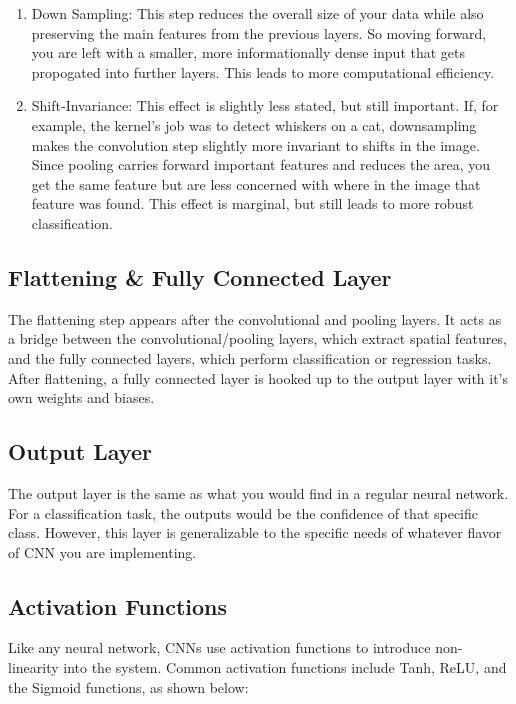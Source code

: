 \documentclass{article}
\begin{document}
        \begin{enumerate}
            \item Down Sampling: This step reduces the overall size of your data while also preserving the main features from the previous layers. So moving forward, you are left with a smaller, more informationally dense input that gets propogated into further layers. This leads to more computational efficiency.
            \item Shift-Invariance: This effect is slightly less stated, but still important. If, for example, the kernel's job was to detect whiskers on a cat, downsampling makes the convolution step slightly more invariant to shifts in the image. Since pooling carries forward important features and reduces the area, you get the same feature but are less concerned with where in the image that feature was found. This effect is marginal, but still leads to more robust classification.
        \end{enumerate}

    \subsection{Flattening \& Fully Connected Layer}
        The flattening step appears after the convolutional and pooling layers. It acts as a bridge between the convolutional/pooling layers, which extract spatial features, and the fully connected layers, which perform classification or regression tasks. After flattening, a fully connected layer is hooked up to the output layer with it's own weights and biases.
        
    \subsection{Output Layer}
        The output layer is the same as what you would find in a regular neural network. For a classification task, the outputs would be the confidence of that specific class. However, this layer is generalizable to the specific needs of whatever flavor of CNN you are implementing.

    \subsection{Activation Functions}
        Like any neural network, CNNs use activation functions to introduce non-linearity into the system. Common activation functions include Tanh, ReLU, and the Sigmoid functions, as shown below:
\end{document}
